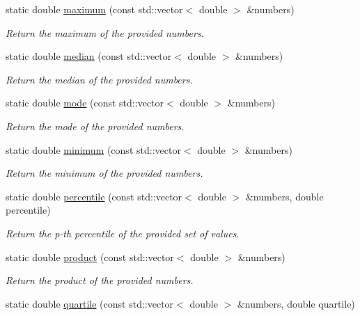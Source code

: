 \begin{DoxyCompactItemize}
static double \hyperlink{classmultiscale_1_1Numeric_ab55b4d890c6221a8e10b37a0e5f2cbdc}{maximum} (const std\-::vector$<$ double $>$ \&numbers)
\begin{DoxyCompactList}\small\item\em Return the maximum of the provided numbers. \end{DoxyCompactList}\item 
static double \hyperlink{classmultiscale_1_1Numeric_a254f9df60a269739a1bfd5e7c383aed2}{median} (const std\-::vector$<$ double $>$ \&numbers)
\begin{DoxyCompactList}\small\item\em Return the median of the provided numbers. \end{DoxyCompactList}\item 
static double \hyperlink{classmultiscale_1_1Numeric_a09dc6e20116ac163389d3b07a99618e1}{mode} (const std\-::vector$<$ double $>$ \&numbers)
\begin{DoxyCompactList}\small\item\em Return the mode of the provided numbers. \end{DoxyCompactList}\item 
static double \hyperlink{classmultiscale_1_1Numeric_a1ba7305dcaa1d1baf17946beb233145d}{minimum} (const std\-::vector$<$ double $>$ \&numbers)
\begin{DoxyCompactList}\small\item\em Return the minimum of the provided numbers. \end{DoxyCompactList}\item 
static double \hyperlink{classmultiscale_1_1Numeric_aff0c6b0c3d82bec3761a5e2d08394513}{percentile} (const std\-::vector$<$ double $>$ \&numbers, double percentile)
\begin{DoxyCompactList}\small\item\em Return the p-\/th percentile of the provided set of values. \end{DoxyCompactList}\item 
static double \hyperlink{classmultiscale_1_1Numeric_af07966e00665420d17a8f4d2cd1d74b4}{product} (const std\-::vector$<$ double $>$ \&numbers)
\begin{DoxyCompactList}\small\item\em Return the product of the provided numbers. \end{DoxyCompactList}\item 
static double \hyperlink{classmultiscale_1_1Numeric_a127a2b3e5e659b4e493767ba23fc45da}{quartile} (const std\-::vector$<$ double $>$ \&numbers, double quartile)

\end{DoxyCompactItemize}
